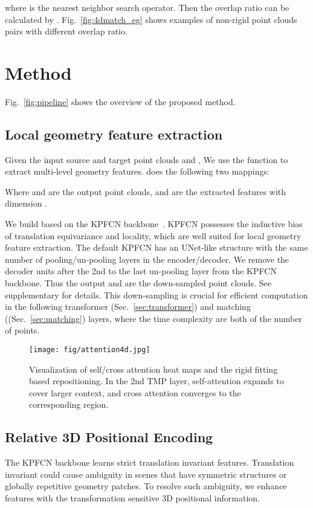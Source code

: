 where  is the nearest neighbor search operator.
Then the overlap ratio can be calculated by . Fig.~\ref{fig:4dmatch_eg} shows examples of non-rigid point clouds pairs with different overlap ratio. 


\section{Method}

Fig.~\ref{fig:pipeline} shows the overview of the proposed method.

\subsection{Local geometry feature extraction}\label{sec:backbone}
Given the input source and target point clouds  and ,
We use the function  to extract multi-level geometry features.  does the following two mappings:

Where  and   are the output point clouds,  and  are the extracted features with dimension .

We build  based on the  KPFCN backbone~\cite{thomas2019kpconv}.
KPFCN possesses the inductive bias of translation equivariance and locality, which are well suited for local geometry feature extraction.
The default KPFCN has an UNet-like structure with the same number of pooling/un-pooling layers in the encoder/decoder. We remove the decoder units after the 2nd to the last un-pooling layer from the KPFCN backbone. Thus the output  and  are the down-sampled point clouds. See supplementary for details.
This down-sampling is crucial for efficient computation in the following transformer (Sec.~\ref{sec:transformer}) and matching ((Sec.~\ref{sec:matching}) layers, where the time complexity are both  of the number of points.


\begin{figure*}[!t]
    \centering
\texttt{[image: fig/attention4d.jpg]}
\caption{
Visualization of self/cross attention heat maps and the rigid fitting based repositioning.  In the 2nd TMP layer, self-attention expands to cover larger context, and cross attention converges to the corresponding region. 
}
\label{fig:attention4d}
\end{figure*}



\subsection{Relative 3D Positional Encoding}
\label{sec:3d_pe}
The KPFCN backbone learns strict translation invariant features.
Translation invariant could cause ambiguity in scenes that have symmetric structures or globally repetitive geometry patches.
To resolve such ambiguity, we enhance features with the transformation sensitive 3D positional information.

